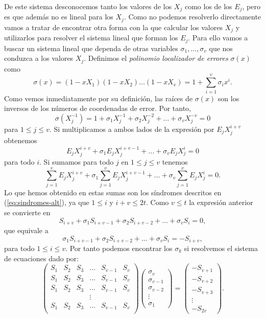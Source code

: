 De este sistema desconocemos tanto los valores de los \(X_j\) como los de los \(E_j\), pero es que además no es lineal para los \(X_j\).
Como no podemos resolverlo directamente vamos a tratar de encontrar otra forma con la que calcular los valores \(X_j\) y utilizarlos para resolver el sistema lineal que forman los \(E_j\).
Para ello vamos a buscar un sistema lineal que dependa de otras variables \(\sigma_1, \dots, \sigma_v\) que nos conduzca a los valores \(X_j\).
Definimos el \textit{polinomio localizador de errores} \(\sigma(x)\) como
\[
  \sigma(x) = (1 - xX_1)(1 - xX_2) \dots (1 - xX_v) = 1 + \sum_{i=1}^v \sigma_ix^i.
\]
Como vemos inmediatamente por su definición, las raíces de \(\sigma(x)\) son los inversos de los números de coordenadas de error.
Por tanto,
\[
  \sigma(X_j^{-1}) = 1 + \sigma_1X_j^{-1} + \sigma_2X_j^{-2} + \dots + \sigma_vX_j^{-v} = 0
\]
para \(1 \leq j \leq v\).
Si multiplicamos a ambos lados de la expresión por \(E_jX_j^{i+v}\) obtenemos
\[
  E_jX_j^{i+v} + \sigma_1E_jX_j^{i+v-1} + \dots + \sigma_vE_jX_j^{i} = 0
\]
para todo \(i\).
Si sumamos para todo \(j\) en \(1 \leq j \leq v\) tenemos
\[
  \sum_{j=1}^v E_jX_j^{i+v} + \sigma_1\sum_{j=1}^v E_jX_j^{i+v-1} + \dots + \sigma_v \sum_{j=1}^v E_jX_j^i = 0.
\]
Lo que hemos obtenido en estas sumas son los síndromes descritos en (\ref{eq:sindromes-alt}), ya que \(1 \leq i \) y \(i+v \leq 2t\).
Como \(v \leq t\) la expresión anterior se convierte en
\[
  S_{i+v} + \sigma_1S_{i+v-1} + \sigma_2S_{i+v-2} + \dots + \sigma_vS_i = 0,
\]
que equivale a
  \[
    \sigma_1S_{i+v-1} + \sigma_2S_{i+v-2} + \dots + \sigma_vS_i = -S_{i+v},
  \]
para todo \(1 \leq i \leq v\).
Por tanto podemos encontrar los \(\sigma_k\) si resolvemos el sistema de ecuaciones dado por:
\[
  \begin{pmatrix}
    S_1 & S_2 & S_3 & \dots & S_{v-1} & S_v \\
    S_1 & S_2 & S_3 & \dots & S_{v-1} & S_v \\
    S_1 & S_2 & S_3 & \dots & S_{v-1} & S_v \\
     & & & \vdots & & \\
    S_1 & S_2 & S_3 & \dots & S_{v-1} & S_v \\
  \end{pmatrix} \begin{pmatrix}
    \sigma_v \\
    \sigma_{v-1} \\
    \sigma_{v-2} \\
    \vdots\\
    \sigma_1
  \end{pmatrix} = \begin{pmatrix}
    -S_{v+1}\\
    -S_{v+2}\\
    -S_{v+3}\\
    \vdots\\
    -S_{2v}
  \end{pmatrix}.
\]
